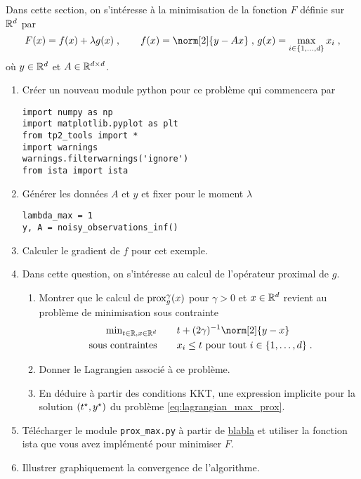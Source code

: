 \documentclass[a4paper,french,12pt]{article}
\begin{document}
Dans cette section, on s'intéresse à la minimisation de la fonction $F$ définie sur $\mathbb{R}^d$ par
\begin{equation*}
  F(x) = f(x) + \lambda g(x) \eqsp, \qquad f(x) = \norm[2]{y-Ax} \eqsp, \, g(x)= \max_{i \in \{1,\ldots,d\}} x_i \eqsp,
\end{equation*}
où $y \in \mathbb{R}^d$ et $A \in \mathbb{R}^{d\times d}$. 
\begin{enumerate}
\item Créer un nouveau module python pour ce problème qui commencera par
\begin{lstlisting}
import numpy as np
import matplotlib.pyplot as plt
from tp2_tools import *
import warnings
warnings.filterwarnings('ignore')
from ista import ista
\end{lstlisting}
\item Générer les données $A$ et $y$ et fixer pour le moment $\lambda$
  \begin{lstlisting}
lambda_max = 1
y, A = noisy_observations_inf()
  \end{lstlisting}
\item Calculer le gradient de $f$ pour cet exemple.
\item Dans cette question, on s'intéresse au calcul de l'opérateur proximal de $g$.
  \begin{enumerate}
  \item Montrer que le calcul de $\operatorname{prox}_g^{\gamma}(x)$ pour $\gamma>0$ et $x \in \mathbb{R}^d$ revient au problème de minimisation sous contrainte
    \begin{equation}
      \label{eq:lagrangian_max_prox}
      \begin{aligned}
      \text{min}_{t \in \rset, x \in \rset^d} &\qquad t + (2 \gamma)^{-1} \norm[2]{y-x} \\
      \text{ sous contraintes} &\qquad x_i \leq t \text{ pour tout $i \in \{1,\ldots,d\}$} \eqsp.
      \end{aligned}
    \end{equation}
  \item Donner le Lagrangien associé à ce problème.
  \item En déduire à partir des conditions KKT, une expression
    implicite pour la solution $(t^{\star},y^{\star})$ du problème \eqref{eq:lagrangian_max_prox}.     
  \end{enumerate}
  
\item Télécharger le module  \lstinline+prox_max.py+ à partir de \url{blabla} et utiliser la fonction ista que vous avez implémenté pour minimiser $F$.
  
\item Illustrer graphiquement la convergence de l'algorithme. 
\end{enumerate}
\end{document}

